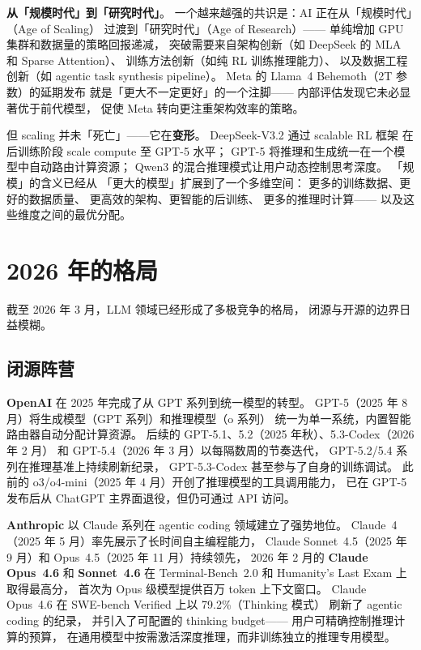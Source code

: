 \textbf{从「规模时代」到「研究时代」}。
一个越来越强的共识是：AI 正在从「规模时代」（Age of Scaling）
过渡到「研究时代」（Age of Research）——
单纯增加 GPU 集群和数据量的策略回报递减，
突破需要来自架构创新（如 DeepSeek 的 MLA 和 Sparse Attention）、
训练方法创新（如纯 RL 训练推理能力）、
以及数据工程创新（如 agentic task synthesis pipeline）。
Meta 的 Llama~4 Behemoth（2T 参数）的延期发布
就是「更大不一定更好」的一个注脚——
内部评估发现它未必显著优于前代模型，
促使 Meta 转向更注重架构效率的策略。

但 scaling 并未「死亡」——它在\textbf{变形}。
DeepSeek-V3.2 通过 scalable RL 框架
在后训练阶段 scale compute 至 GPT-5 水平；
GPT-5 将推理和生成统一在一个模型中自动路由计算资源；
Qwen3 的混合推理模式让用户动态控制思考深度。
「规模」的含义已经从
「更大的模型」扩展到了一个多维空间：
更多的训练数据、更好的数据质量、
更高效的架构、更智能的后训练、
更多的推理时计算——
以及这些维度之间的最优分配。

\section{2026 年的格局}

截至 2026 年 3 月，LLM 领域已经形成了多极竞争的格局，
闭源与开源的边界日益模糊。

\subsection{闭源阵营}

\textbf{OpenAI} 在 2025 年完成了从 GPT 系列到统一模型的转型。
GPT-5（2025 年 8 月）将生成模型（GPT 系列）和推理模型（o 系列）
统一为单一系统，内置智能路由器自动分配计算资源。
后续的 GPT-5.1、5.2（2025 年秋）、5.3-Codex（2026 年 2 月）
和 GPT-5.4（2026 年 3 月）以每隔数周的节奏迭代，
GPT-5.2/5.4 系列在推理基准上持续刷新纪录，
GPT-5.3-Codex 甚至参与了自身的训练调试。
此前的 o3/o4-mini（2025 年 4 月）开创了推理模型的工具调用能力，
已在 GPT-5 发布后从 ChatGPT 主界面退役，但仍可通过 API 访问。

\textbf{Anthropic} 以 Claude 系列在 agentic coding 领域建立了强势地位。
Claude~4（2025 年 5 月）率先展示了长时间自主编程能力，
Claude Sonnet~4.5（2025 年 9 月）和 Opus~4.5（2025 年 11 月）持续领先，
2026 年 2 月的 \textbf{Claude Opus~4.6} 和 \textbf{Sonnet~4.6}
在 Terminal-Bench~2.0 和 Humanity's Last Exam 上取得最高分，
首次为 Opus 级模型提供百万 token 上下文窗口。
Claude Opus~4.6 在 SWE-bench Verified 上以 79.2\%（Thinking 模式）
刷新了 agentic coding 的纪录，
并引入了可配置的 thinking budget——
用户可精确控制推理计算的预算，
在通用模型中按需激活深度推理，而非训练独立的推理专用模型。

